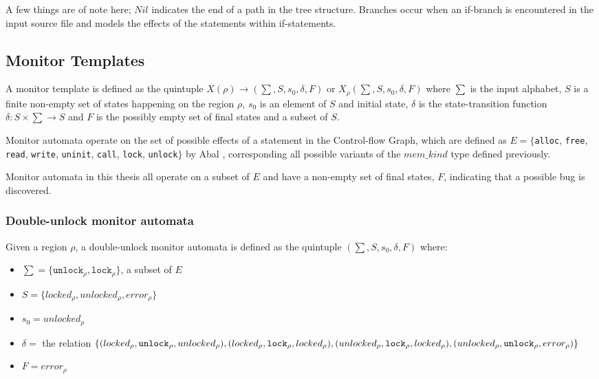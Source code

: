 \noindent A few things are of note here; $Nil$ indicates the end of a path in the tree structure. Branches occur when an if-branch is encountered in the input source file and models the effects of the statements within if-statements.

\subsection{Monitor Templates}

\noindent {}

\noindent A monitor template is defined as the quintuple $X(\rho) \rightarrow (\sum, S, s_0, \delta, F)$ or  $X_\rho (\sum, S, s_0, \delta, F)$ where $\sum$ is the input alphabet, $S$ is a finite non-empty set of states happening on the region $\rho$, $s_0$ is an element of $S$ and initial state, $\delta$ is the state-transition function $\delta: S \times \sum \rightarrow S$ and $F$ is the possibly empty set of final states and a subset of $S$.

\newpar Monitor automata operate on the set of possible effects of a statement in the Control-flow Graph, which are defined as $E = \{$\texttt{alloc}, \texttt{free}, \texttt{read}, \texttt{write}, \texttt{uninit}, \texttt{call}, \texttt{lock}, \texttt{unlock}$\}$ by Abal \cite{EffectiveBugFinding}, corresponding all possible variants of the $mem\_kind$ type defined previously. 

\newpar Monitor automata in this thesis all operate on a subset of $E$ and have a non-empty set of final states, $F$, indicating that a possible bug is discovered.  

\subsubsection{Double-unlock monitor automata}

Given a region $\rho$, a double-unlock monitor automata is defined as the quintuple $(\sum, S, s_0, \delta, F)$ where: 

\begin{itemize}
    \item $\sum = \{\texttt{unlock}_\rho, \texttt{lock}_\rho\}$, a subset of $E$
    \item $S = \{ locked_\rho, unlocked_\rho, error_\rho \}$
    \item $s_0 = unlocked_\rho$ 
    \item $\delta =$ the relation $\{(locked_\rho, \texttt{unlock}_\rho, unlocked_\rho), (locked_\rho, \texttt{lock}_\rho, locked_\rho), \\
        (unlocked_\rho, \texttt{lock}_\rho, locked_\rho), (unlocked_\rho, \texttt{unlock}_\rho, error_\rho)\}$ 
    \item $F = error_\rho$  
\end{itemize}


